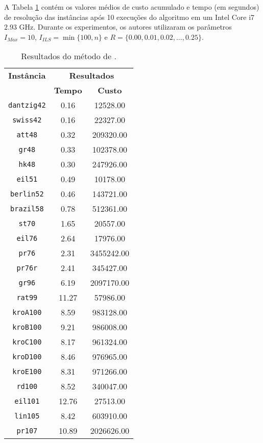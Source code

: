 A Tabela \ref{tab:mlpResults} contém os valores médios de custo acumulado e tempo (em segundos) de resolução das instâncias após 10 execuções do algoritmo em um Intel{\textregistered} Core{\texttrademark} i7 $2.93$ GHz. Durante os experimentos, os autores utilizaram os parâmetros $I_{Max} = 10$, $I_{ILS} = \min\{100,n\}$ e $R = \{0.00, 0.01, 0.02,\dots,0.25\}$.
 \begin{table}[!ht]
 \centering
 \caption{Resultados do método de \cite{SILVA2012513}.}
 \footnotesize
 \begin{tabular}{ccc}
 \toprule
\multirow{2.5}{*}{\textbf{Instância}} & \multicolumn{2}{c}{\textbf{Resultados}} \\
\cmidrule{2-3} & \textbf{Tempo} & \textbf{Custo} \\
\midrule
  \texttt{dantzig42}   & 0.16 & 12528.00 \\ 
  \texttt{swiss42}   & 0.16 & 22327.00 \\ 
  \texttt{att48}   & 0.32 & 209320.00 \\ 
  \texttt{gr48}   & 0.33 & 102378.00 \\ 
  \texttt{hk48}   & 0.30 & 247926.00 \\ 
  \texttt{eil51}   & 0.49 & 10178.00 \\ 
  \texttt{berlin52}   & 0.46 & 143721.00 \\ 
  \texttt{brazil58}   & 0.78 & 512361.00 \\ 
  \texttt{st70}   & 1.65 & 20557.00 \\ 
  \texttt{eil76}   & 2.64 & 17976.00 \\ 
  \texttt{pr76}   & 2.31 & 3455242.00 \\ 
  \texttt{pr76r}   & 2.41 & 345427.00 \\ 
  \texttt{gr96}   & 6.19 & 2097170.00 \\ 
  \texttt{rat99}   & 11.27 & {57986.00} \\ 
  \texttt{kroA100}   & 8.59 & 983128.00 \\ 
  \texttt{kroB100}   & 9.21 & 986008.00 \\ 
  \texttt{kroC100}   & 8.17 & 961324.00 \\ 
  \texttt{kroD100}   & 8.46 & 976965.00 \\ 
  \texttt{kroE100}   & 8.31 & 971266.00 \\ 
  \texttt{rd100}   & 8.52 & 340047.00 \\ 
  \texttt{eil101}   & 12.76 & {27513.00} \\ 
  \texttt{lin105}   & 8.42 & 603910.00 \\ 
  \texttt{pr107}   & 10.89 & 2026626.00 \\ 
\bottomrule
 \end{tabular}
 \label{tab:mlpResults}
 \end{table}
 
